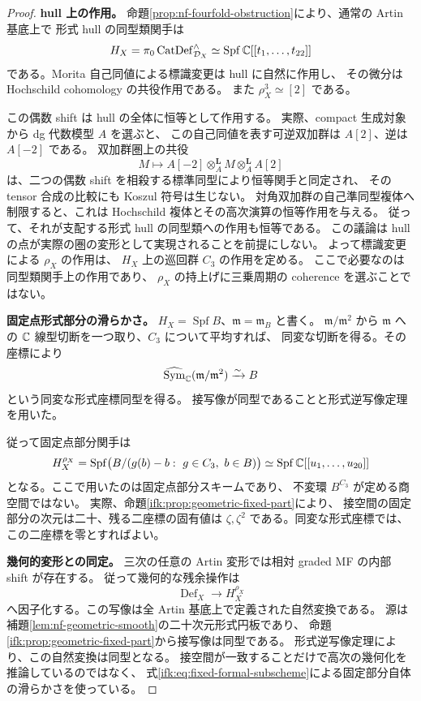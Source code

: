 \begin{proof}
\textbf{hull 上の作用。}
命題\ref{prop:nf-fourfold-obstruction}により、通常の Artin 基底上で
形式 hull の同型類関手は
\[
  H_X=\pi_0\operatorname{CatDef}^{\wedge}_{\mathcal D_X}
       \simeq\operatorname{Spf}\mathbb C[[t_1,\ldots,t_{22}]]
\]
である。Morita 自己同値による標識変更は hull に自然に作用し、
その微分は Hochschild cohomology の共役作用である。
また $\rho_X^3\simeq[2]$ である。

この偶数 shift は hull の全体に恒等として作用する。
実際、compact 生成対象から dg 代数模型 $A$ を選ぶと、
この自己同値を表す可逆双加群は $A[2]$、逆は $A[-2]$ である。
双加群圏上の共役
\[
 M\longmapsto A[-2]\otimes_A^{\mathbf L}M
                          \otimes_A^{\mathbf L}A[2]
\]
は、二つの偶数 shift を相殺する標準同型により恒等関手と同定され、
その tensor 合成の比較にも Koszul 符号は生じない。
対角双加群の自己準同型複体へ制限すると、これは
Hochschild 複体とその高次演算の恒等作用を与える。
従って、それが支配する形式 hull の同型類への作用も恒等である。
この議論は hull の点が実際の圏の変形として実現されることを前提にしない。
よって標識変更による $\rho_X$ の作用は、
$H_X$ 上の巡回群 $C_3$ の作用を定める。
ここで必要なのは同型類関手上の作用であり、
$\rho_X$ の持上げに三乗周期の coherence を選ぶことではない。

\textbf{固定点形式部分の滑らかさ。}
$H_X=\operatorname{Spf}B$、$\mathfrak m=\mathfrak m_B$ と書く。
$\mathfrak m/\mathfrak m^2$ から $\mathfrak m$ への
$\mathbb C$ 線型切断を一つ取り、$C_3$ について平均すれば、
同変な切断を得る。その座標により
\[
 \widehat{\operatorname{Sym}}_{\mathbb C}(\mathfrak m/\mathfrak m^2)
                 \xrightarrow{\sim}B
\]
という同変な形式座標同型を得る。
接写像が同型であることと形式逆写像定理を用いた。

従って固定点部分関手は
\begin{equation}\label{ifk:eq:fixed-formal-subscheme}
 H_X^{\rho_X}
   =\operatorname{Spf}\bigl(B/(g(b)-b:\ g\in C_3,\ b\in B)\bigr)
                 \simeq\operatorname{Spf}\mathbb C[[u_1,\ldots,u_{20}]]
\end{equation}
となる。ここで用いたのは固定点部分スキームであり、
不変環 $B^{C_3}$ が定める商空間ではない。
実際、命題\ref{ifk:prop:geometric-fixed-part}により、
接空間の固定部分の次元は二十、残る二座標の固有値は
$\zeta,\zeta^2$ である。同変な形式座標では、この二座標を零とすればよい。

\textbf{幾何的変形との同定。}
三次の任意の Artin 変形では相対 graded MF の内部 shift が存在する。
従って幾何的な残余操作は
\[
       \operatorname{Def}_X\longrightarrow H_X^{\rho_X}
\]
へ因子化する。この写像は全 Artin 基底上で定義された自然変換である。
源は補題\ref{lem:nf-geometric-smooth}の二十次元形式円板であり、
命題\ref{ifk:prop:geometric-fixed-part}から接写像は同型である。
形式逆写像定理により、この自然変換は同型となる。
接空間が一致することだけで高次の幾何化を推論しているのではなく、
式\eqref{ifk:eq:fixed-formal-subscheme}による固定部分自体の滑らかさを使っている。


\end{proof}
